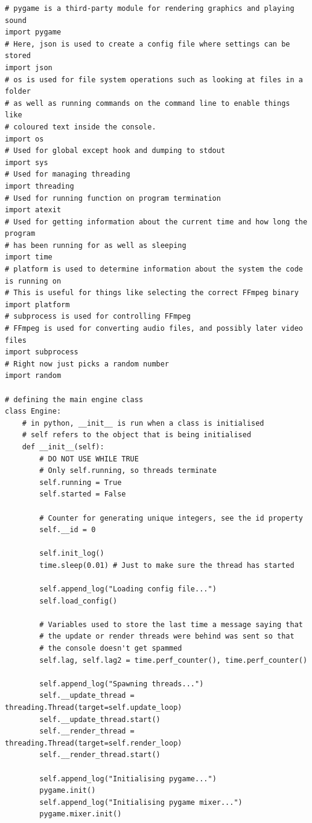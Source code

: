 \documentclass{report}
\begin{document}
\begin{verbatim}
# pygame is a third-party module for rendering graphics and playing sound
import pygame
# Here, json is used to create a config file where settings can be stored
import json
# os is used for file system operations such as looking at files in a folder
# as well as running commands on the command line to enable things like
# coloured text inside the console.
import os
# Used for global except hook and dumping to stdout
import sys
# Used for managing threading
import threading
# Used for running function on program termination
import atexit
# Used for getting information about the current time and how long the program
# has been running for as well as sleeping
import time
# platform is used to determine information about the system the code is running on
# This is useful for things like selecting the correct FFmpeg binary
import platform
# subprocess is used for controlling FFmpeg
# FFmpeg is used for converting audio files, and possibly later video files
import subprocess
# Right now just picks a random number
import random

# defining the main engine class
class Engine:
    # in python, __init__ is run when a class is initialised
    # self refers to the object that is being initialised
    def __init__(self):
        # DO NOT USE WHILE TRUE
        # Only self.running, so threads terminate
        self.running = True
        self.started = False

        # Counter for generating unique integers, see the id property
        self.__id = 0

        self.init_log()
        time.sleep(0.01) # Just to make sure the thread has started

        self.append_log("Loading config file...")
        self.load_config()

        # Variables used to store the last time a message saying that
        # the update or render threads were behind was sent so that
        # the console doesn't get spammed
        self.lag, self.lag2 = time.perf_counter(), time.perf_counter()

        self.append_log("Spawning threads...")
        self.__update_thread = threading.Thread(target=self.update_loop)
        self.__update_thread.start()
        self.__render_thread = threading.Thread(target=self.render_loop)
        self.__render_thread.start()

        self.append_log("Initialising pygame...")
        pygame.init()
        self.append_log("Initialising pygame mixer...")
        pygame.mixer.init()


\end{verbatim}
\end{document}
